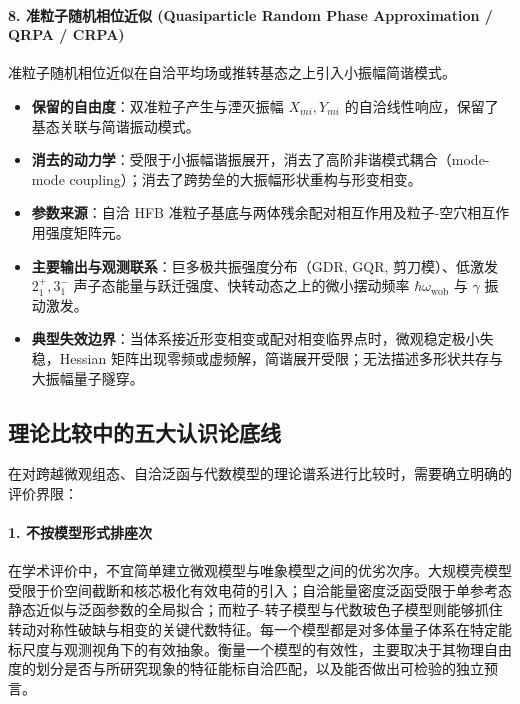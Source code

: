 \paragraph{8. 准粒子随机相位近似 (Quasiparticle Random Phase Approximation / QRPA / CRPA)}
准粒子随机相位近似在自洽平均场或推转基态之上引入小振幅简谐模式。\cite{book-suhonen-from-nucleons-to-nucleus,matsuzaki-2004-nuclear-inertia-and-wobbling,kvasil-2006-dy156-yb162-crpa-wobbling}
\begin{itemize}
\item \textbf{保留的自由度}：双准粒子产生与湮灭振幅 $X_{mi}, Y_{mi}$ 的自洽线性响应，保留了基态关联与简谐振动模式。
\item \textbf{消去的动力学}：受限于小振幅谐振展开，消去了高阶非谐模式耦合（mode-mode coupling）；消去了跨势垒的大振幅形状重构与形变相变。
\item \textbf{参数来源}：自洽 HFB 准粒子基底与两体残余配对相互作用及粒子-空穴相互作用强度矩阵元。
\item \textbf{主要输出与观测联系}：巨多极共振强度分布（GDR, GQR, 剪刀模）、低激发 $2_1^+, 3_1^-$ 声子态能量与跃迁强度、快转动态之上的微小摆动频率 $\hbar\omega_{\mathrm{wob}}$ 与 $\gamma$ 振动激发。
\item \textbf{典型失效边界}：当体系接近形变相变或配对相变临界点时，微观稳定极小失稳，Hessian 矩阵出现零频或虚频解，简谐展开受限；无法描述多形状共存与大振幅量子隧穿。
\end{itemize}

\subsection{理论比较中的五大认识论底线}\label{sec:2-8-3}

在对跨越微观组态、自洽泛函与代数模型的理论谱系进行比较时，需要确立明确的评价界限：

\paragraph{1. 不按模型形式排座次}
在学术评价中，不宜简单建立微观模型与唯象模型之间的优劣次序。大规模壳模型受限于价空间截断和核芯极化有效电荷的引入；自洽能量密度泛函受限于单参考态静态近似与泛函参数的全局拟合；而粒子-转子模型与代数玻色子模型则能够抓住转动对称性破缺与相变的关键代数特征。每一个模型都是对多体量子体系在特定能标尺度与观测视角下的有效抽象。衡量一个模型的有效性，主要取决于其物理自由度的划分是否与所研究现象的特征能标自洽匹配，以及能否做出可检验的独立预言。


